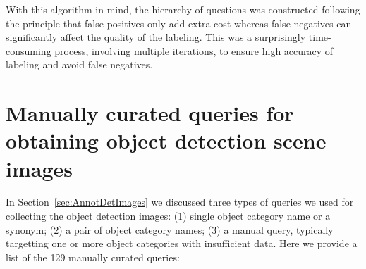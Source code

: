 \begin{appendices}
With this algorithm in mind, the hierarchy of questions was constructed following the principle that false positives only add extra cost whereas false
negatives can significantly affect the quality of the labeling. 
This was a surprisingly time-consuming process, involving multiple iterations, to ensure high accuracy of labeling and avoid false negatives.
\fi

\section{Manually curated queries for obtaining object detection scene images}
\label{sec:AppQueries}

In Section~\ref{sec:AnnotDetImages} we discussed three types of queries we used for collecting the object detection images:
(1) single object category name or a synonym; (2) a pair of object category names; (3) a manual query, typically targetting one or more object categories with insufficient data.
Here we provide a list of the 129 manually curated queries:

\vspace{0.1in}

{\tiny

}
\end{appendices}

